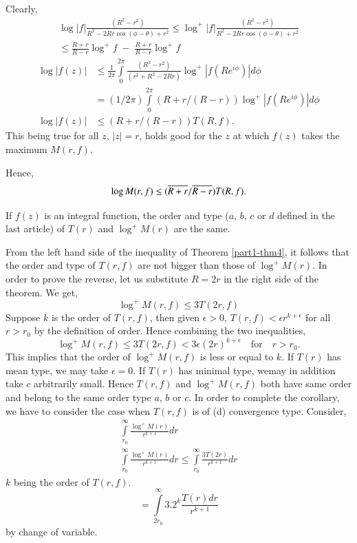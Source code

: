 Clearly,
\begin{gather*}
\log|f|\frac{(R^{2}-r^{2})}{R^{2}-2Rr\cos(\phi-\theta)+r^{2}} \leq
\log^{+}|f|\frac{(R^{2}-r^{2})}{R^{2}-2Rr\cos (\phi-\theta)+r^{2}}\\
\leq \frac{R+r}{R-r}\log^{+}f \;
-\;\frac{R+r}{R-r}\log^{+}f
\end{gather*}\pageoriginale
\begin{align*}
\log|f(z)| &\leq
\frac{1}{2\pi}\int\limits^{2\pi}_{0}\frac{(R^{2}-r^{2})}{(r^{2}+R^{2}-2Rr)}\log^{+}|f(Re^{i\phi})|d\phi\\
&
=(1/2\pi)\int\limits^{2\pi}_{0}(R+r/(R-r))\log^{+}|f(Re^{i\phi})|d\phi\\
\log|f(z)| &\leq (R+r/(R-r)) T(R,f).
\end{align*}
This being true for all $z$, $|z|=r$, holds good for the $z$ at which
$f(z)$ takes the maximum $M(r,f)$.

Hence,
$$
\log M(r,f)\leq (\overline{R+r}/\overline{R-r})T(R,f).
$$

\begin{coro*}
If $f(z)$ is an integral function, the order and type ($a$, $b$, $c$
or $d$ defined in the last article) of $T(r)$ and $\log^{+}M(r)$ are
the same.
\end{coro*}

From the left hand side of the inequality of Theorem \ref{part1-thm4},
it follows that the order and type of $T(r,f)$ are not bigger than
those of $\log^{+}M(r)$. In order to prove the reverse, let us
substitute $R=2r$ in the right side of the theorem. We get,
$$
\log^{+}M(r,f)\leq 3T(2r,f)
$$
Suppose $k$ is the order of $T(r,f)$, then given $\epsilon>0$,
$T(r,f)<\epsilon r^{k+\epsilon}$ for all $r>r_{0}$ by the definition
of order. Hence combining the two inequalities,
$$
\log^{+}M(r,f)\leq 3T(2r,f)<3 \epsilon
(2r)^{k+\epsilon}\quad\text{for}\quad r>r_{0}.
$$
This implies that the order of $\log^{+}M(r,f)$ is less or equal to
$k$. If $T(r)$ has mean type, we may take $\epsilon=0$. If $T(r)$ has
minimal type, we\pageoriginale may in addition take $c$ arbitrarily
small. Hence $T(r,f)$ and $\log^{+}M(r,f)$ both have same order and
belong to the same order type $a$, $b$ or $c$. In order to complete
the corollary, we have to consider the case when $T(r,f)$ is of (d)
\iec convergence type. Consider,
\begin{gather*}
\int\limits^{\infty}_{r_{0}}\frac{\log^{+}M(r)}{r^{k+1}}dr\\
\int\limits^{\infty}_{r_{0}}\frac{\log^{+}M(r)}{r^{k+1}}dr\leq 
\int\limits^{\infty}_{r_{0}}\frac{3T(2r)}{r^{k+1}}dr
\end{gather*}
$k$ being the order of $T(r,f)$.
$$
=\int\limits^{\infty}_{2r_{0}}3.2^{k}\frac{T(r)dr}{r^{k+1}}
$$
by change of variable.

